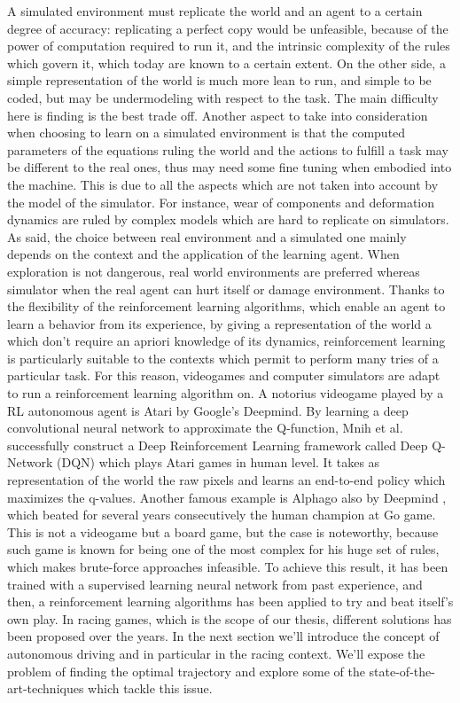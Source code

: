 A simulated environment must replicate the world and an agent to a certain degree of accuracy: replicating a perfect copy would be unfeasible, because of the power of computation required to run it, and the intrinsic complexity of the rules which govern it, which today are known to a certain extent. On the other side, a simple representation of the world is much more lean to run, and simple to be coded, but may be undermodeling with respect to the task. The main difficulty here is finding is the best trade off. Another aspect to take into consideration when choosing to learn on a simulated environment is that the computed parameters of the equations ruling the world and the actions to fulfill a task may be different to the real ones, thus may need some fine tuning when embodied into the machine. This is due to all the aspects which are not taken into account by the model of the simulator. For instance, wear of components and deformation dynamics are ruled by complex models which are hard to replicate on simulators.
As said, the choice between real environment and a simulated one mainly depends on the context and the application of the learning agent. When exploration is not dangerous, real world environments are preferred whereas simulator when the real agent can hurt itself or damage environment.
Thanks to the flexibility of the reinforcement learning algorithms, which enable an agent to learn a behavior from its experience, by giving a representation of the world a which don't require an apriori knowledge of its dynamics, reinforcement learning is particularly suitable to the contexts which permit to perform many tries of a particular task. For this reason, videogames and computer simulators are adapt to run a reinforcement learning algorithm on.
A notorius videogame played by a RL autonomous agent is Atari \cite{atari} by Google's Deepmind. By learning a deep convolutional neural network to approximate the Q-function, Mnih et al. successfully construct a Deep Reinforcement Learning framework called Deep Q-Network (DQN) which plays Atari games in human level. It takes as representation of the world the raw pixels and learns an end-to-end policy which maximizes the q-values.
Another famous example is Alphago also by Deepmind \cite{alphago}, which beated for several years consecutively the human champion at Go game. This is not a videogame but a board game, but the case is noteworthy, because such game is known for being one of the most complex  for his huge set of rules, which makes brute-force approaches infeasible. To achieve this result, it has been trained with a supervised learning neural network from past experience, and then, a reinforcement learning algorithms has been applied to try and beat itself's own play. 
In racing games, which is the scope of our thesis, different solutions has been proposed over the years. In the next section we'll introduce the concept of autonomous driving and in particular in the racing context. We'll expose the problem of finding the optimal trajectory and explore some of the state-of-the-art-techniques which tackle this issue.


